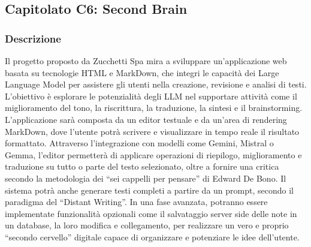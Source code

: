 \documentclass[a4paper,12pt]{article}
\begin{document}
\subsection{Capitolato C6: Second Brain}

\subsubsection{Descrizione}
Il progetto proposto da Zucchetti Spa mira a sviluppare un’applicazione web basata su tecnologie HTML e MarkDown, che integri le capacità dei Large Language Model per assistere gli utenti nella creazione, revisione e analisi di testi. L’obiettivo è esplorare le potenzialità degli LLM nel supportare attività come il miglioramento del tono, la riscrittura, la traduzione, la sintesi e il brainstorming.  
L’applicazione sarà composta da un editor testuale e da un’area di rendering MarkDown, dove l’utente potrà scrivere e visualizzare in tempo reale il risultato formattato. Attraverso l’integrazione con modelli come Gemini, Mistral o Gemma, l’editor permetterà di applicare operazioni di riepilogo, miglioramento e traduzione su tutto o parte del testo selezionato, oltre a fornire una critica secondo la metodologia dei “sei cappelli per pensare” di Edward De Bono.  
Il sistema potrà anche generare testi completi a partire da un prompt, secondo il paradigma del “Distant Writing”. In una fase avanzata, potranno essere implementate funzionalità opzionali come il salvataggio server side delle note in un database, la loro modifica e collegamento, per realizzare un vero e proprio “secondo cervello” digitale capace di organizzare e potenziare le idee dell’utente.
\end{document}

